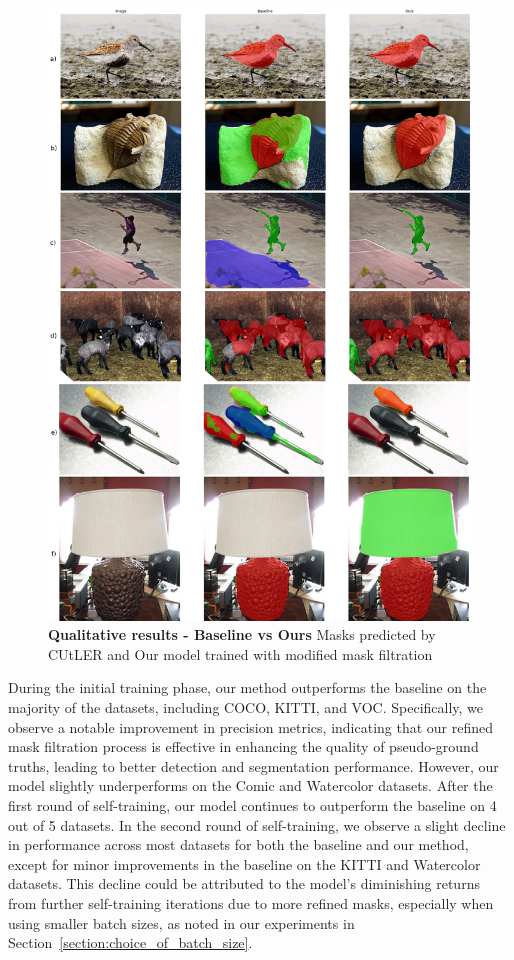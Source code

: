 \begin{figure}
	\centering
	\includegraphics[width=1.05\textwidth]{Images/main/cutler_vs_ours.png}
	\caption[\textbf{Qualitative Results - Baseline vs Ours}]{\textbf{Qualitative results - Baseline vs Ours} Masks predicted by CUtLER and Our model trained with modified mask filtration}
	\label{fig:cuter_vs_ours}
\end{figure} 

During the initial training phase, our method outperforms the baseline on the majority of the datasets, including COCO, KITTI, and VOC. Specifically, we observe a notable improvement in precision metrics, indicating that our refined mask filtration process is effective in enhancing the quality of pseudo-ground truths, leading to better detection and segmentation performance. However, our model slightly underperforms on the Comic and Watercolor datasets. After the first round of self-training, our model continues to outperform the baseline on 4 out of 5 datasets. In the second round of self-training, we observe a slight decline in performance across most datasets for both the baseline and our method, except for minor improvements in the baseline on the KITTI and Watercolor datasets. This decline could be attributed to the model’s diminishing returns from further self-training iterations due to more refined masks, especially when using smaller batch sizes, as noted in our experiments in Section~\ref{section:choice_of_batch_size}.

